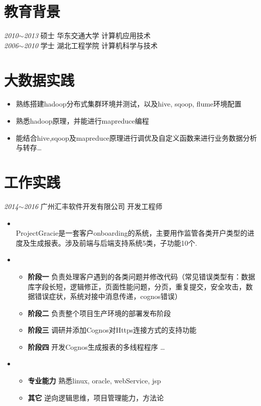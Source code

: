 \documentclass[line,margin]{res}
\begin{document}
\begin{resume}	
\section{教育背景}

{\sl 2010$\sim$2013} \hfill 硕士 \hfill 华东交通大学 \hfill 计算机应用技术 \\
[10pt]
{\sl 2006$\sim$2010} \hfill 学士 \hfill 湖北工程学院 \hfill 计算机科学与技术 \\


\section{大数据实践} 
\begin{itemize}
	\item 熟练搭建hadoop分布式集群环境并测试，以及hive, sqoop, flume环境配置
	\item 熟悉hadoop原理，并能进行mapreduce编程
    \item 能结合hive,sqoop及mapreduce原理进行调优及自定义函数来进行业务数据分析与转存\ldots
\end{itemize}	

\section{工作实践} 
{\sl 2014$\sim$2016} \hfill 广州汇丰软件开发有限公司 \hfill 开发工程师 \\
\begin{itemize}
\item {} \\ProjectGracie是一套客户onboarding的系统，主要用作监管各类开户类型的进度及生成报表。涉及前端与后端支持系统5类，子功能10个. \\
\item {}
	\begin{itemize} \itemsep -3pt
		\item {\bf 阶段一} 负责处理客户遇到的各类问题并修改代码（常见错误类型有：数据库字段长短，逻辑修正，页面性能问题，分页，重复提交，安全攻击，数据错误症状，系统对接中消息传递，cognos错误）
		\item {\bf 阶段二} 负责整个项目生产环境的部署发布阶段
		\item {\bf 阶段三} 调研并添加Cognos对Https连接方式的支持功能
		\item {\bf 阶段四} 开发Cognos生成报表的多线程程序 \ldots 
	\end{itemize}	
\item {}
	\begin{itemize}
		\item {\bf 专业能力} 熟悉linux, oracle, webService, jsp
		\item {\bf 其它} 逆向逻辑思维，项目管理能力，方法论
	\end{itemize}


\end{itemize}
\end{resume}
\end{document}
